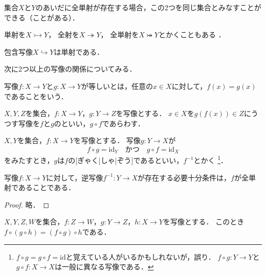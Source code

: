 \documentclass[../sotsu.tex]{subfiles}
\begin{document}
集合$X$と$Y$のあいだに全単射が存在する場合，この2つを同じ集合とみなすことができる（ことがある）．

単射を$X \rightarrowtail Y$，
全射を$X \twoheadrightarrow Y$，
全単射を$X \twoheadrightarrowtail Y$とかくこともある%
\cite{unicode-arrows}\cite{unicode-arrows-B}．

\begin{example}
    包含写像$X \hookrightarrow Y$は単射である．
\end{example}

次に2つ以上の写像の関係についてみる．

\begin{definition}[写像の一致]
    写像$f \colon X \to Y$と$g \colon X \to Y$が等しいとは，任意の$x \in X$に対して，$f(x) = g(x)$であることをいう．
\end{definition}

\begin{definition}[写像の合成]
    \label{dfn:map-composition}
    $X, Y, Z$を集合，$f \colon X \to Y$，$g \colon Y \to Z$を写像とする．
    $x \in X$を$g(f(x)) \in Z$にうつす写像を$f$と$g$のといい，$g \circ f$であらわす．
\end{definition}

\begin{definition}[逆写像]
    \label{dfn:inverse-map}
    $X, Y$を集合，$f \colon X \to Y$を写像とする．
    写像$g \colon Y \to X$が
    \[  f \circ g = \mathrm{id}_Y  \quad \text{かつ} \quad  g \circ f = \mathrm{id}_X  \]
    をみたすとき，$g$は$f$の[ぎゃく|しゃ|ぞう]であるといい，$f^{-1}$とかく%
    \footnote{
        $f \circ g = g \circ f = \mathrm{id}$と覚えている人がいるかもしれないが，誤り．
        $f \circ g \colon Y \to Y$と$g \circ f \colon X \to X$は一般に異なる写像である．
    }．
\end{definition}

\begin{theorem}
    \label{thm:inverse-map-exists-iff}
    写像$f \colon X \to Y$に対して，逆写像$f^{-1} \colon Y \to X$が存在する必要十分条件は，$f$が全単射であることである．
\end{theorem}

\begin{proof}
    略．
\end{proof}

\begin{proposition}
    \label{thm:map-is-associative}
    $X, Y, Z, W$を集合，$f \colon Z \to W$，$g \colon Y \to Z$，$h \colon X \to Y$を写像とする．
    このとき$f \circ (g \circ h) = (f \circ g) \circ h$である．
\end{proposition}
\end{document}
